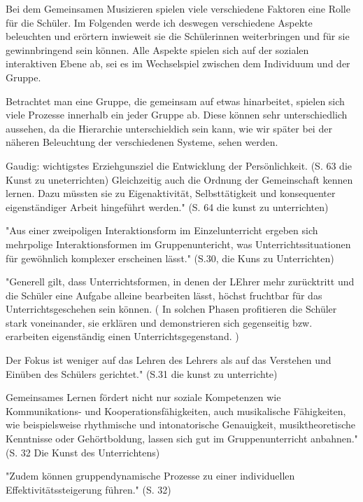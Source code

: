 




Bei dem Gemeinsamen Musizieren spielen viele verschiedene Faktoren eine Rolle
für die Schüler. Im Folgenden werde ich deswegen verschiedene Aspekte
beleuchten und erörtern inwieweit sie die Schülerinnen weiterbringen und für sie
gewinnbringend sein können.
Alle Aspekte spielen sich auf der sozialen interaktiven Ebene ab, sei es im
Wechselspiel zwischen dem Individuum und der Gruppe. 

Betrachtet man eine Gruppe, die gemeinsam auf etwas hinarbeitet, spielen sich
viele Prozesse innerhalb ein jeder Gruppe ab. Diese können sehr unterschiedlich
aussehen, da die Hierarchie unterschieldich sein kann, wie wir später bei der
näheren Beleuchtung der verschiedenen Systeme, sehen werden. 

Gaudig: wichtigstes Erziehgunsziel die Entwicklung der Persönlichkeit. (S. 63
die Kunst zu uneterrichten) Gleichzeitig auch die Ordnung der Gemeinschaft
kennen lernen. Dazu müssten sie zu Eigenaktivität, Selbsttätigkeit und konsequenter
eigenständiger Arbeit hingeführt werden." (S. 64 die kunst zu unterrichten)

"Aus einer zweipoligen Interaktionsform im Einzelunterricht ergeben sich
mehrpolige Interaktionsformen im Gruppenuntericht, was Unterrichtssituationen
für gewöhnlich komplexer erscheinen lässt." (S.30, die Kuns zu Unterrichten)


"Generell gilt, dass Unterrichtsformen, in denen der LEhrer mehr zurücktritt und
die Schüler eine Aufgabe alleine bearbeiten lässt, höchst fruchtbar für das
Unterrichtsgeschehen sein können. ( In solchen Phasen profitieren die Schüler
stark voneinander, sie erklären und demonstrieren sich gegenseitig bzw.
erarbeiten eigenständig einen Unterrichtsgegenstand. ) 

Der Fokus ist weniger auf
das Lehren des Lehrers als auf das Verstehen und Einüben des Schülers
gerichtet."  (S.31 die kunst zu unterrichte)


Gemeinsames Lernen fördert nicht nur soziale Kompetenzen wie Kommunikations- und
Kooperationsfähigkeiten, auch musikalische Fähigkeiten, wie beispielsweise
rhythmische und intonatorische Genauigkeit, musiktheoretische Kenntnisse oder
Gehörtboldung, lassen sich gut im Gruppenunterricht anbahnen." (S. 32 Die Kunst
des Unterrichtens)

"Zudem können gruppendynamische Prozesse zu einer individuellen
Effektivitätssteigerung führen." (S. 32)

